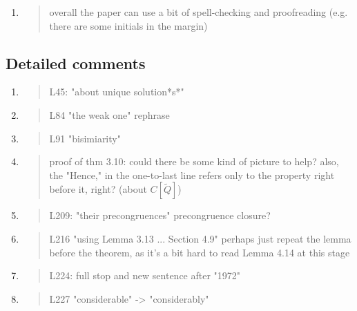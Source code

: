 \begin{enumerate}
\item \begin{quote}
    overall the paper can use a bit of spell-checking and proofreading (e.g. there are some initials in the margin)
  \end{quote}

\end{enumerate}

\subsection*{Detailed comments}

\begin{enumerate}
\item \begin{quote}
    L45: "about unique solution*s*"
  \end{quote}

\item \begin{quote}
    L84 "the weak one" rephrase
  \end{quote}

\item \begin{quote}
    L91 "bisimiarity"
  \end{quote}

\item \begin{quote}
    proof of thm 3.10: could there be some kind of picture to help? also, the "Hence," in the one-to-last line refers only to the property right before it, right? (about $C[\tilde{Q}]$)
  \end{quote}

\item \begin{quote}
    L209: "their precongruences" precongruence closure?
  \end{quote}

\item \begin{quote}
    L216 "using Lemma 3.13 ... Section 4.9" perhaps just repeat the lemma before the theorem, as it's a bit hard to read Lemma 4.14 at this stage 
  \end{quote}

\item \begin{quote}
    L224: full stop and new sentence after "1972"
  \end{quote}

\item \begin{quote}
    L227 "considerable" -> "considerably"
  \end{quote}


\end{enumerate}
